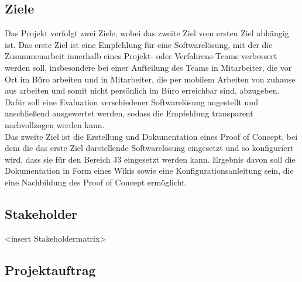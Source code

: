 \documentclass[ThesisDJ.tex]{subfiles}
\begin{document}
	\subsection{Ziele}
	Das Projekt verfolgt zwei Ziele, wobei das zweite Ziel vom ersten Ziel abhängig ist.
	Das erste Ziel ist eine Empfehlung für eine Softwarelösung, mit der die Zusammenarbeit innerhalb eines Projekt- oder Verfahrens-Teams verbessert werden soll, insbesondere bei einer Aufteilung des Teams in Mitarbeiter, die vor Ort im Büro arbeiten und in Mitarbeiter, die per mobilem Arbeiten von zuhause aus arbeiten und somit nicht persönlich im Büro erreichbar sind, abzugeben.\\
	Dafür soll eine Evaluation verschiedener Softwarelösung angestellt und anschließend ausgewertet werden, sodass die Empfehlung transparent nachvollzogen werden kann.\\
	Das zweite Ziel ist die Erstellung und Dokumentation eines Proof of Concept, bei dem die das erste Ziel darstellende Softwarelösung eingesetzt und so konfiguriert wird, dass sie für den Bereich J3 eingesetzt werden kann. Ergebnis davon soll die Dokumentation in Form eines Wikis sowie eine Konfigurationsanleitung sein, die eine Nachbildung des Proof of Concept ermöglicht.
	
	\subsection{Stakeholder}
	<insert Stakeholdermatrix>
	
	\subsection{Projektauftrag}
	
\end{document}

